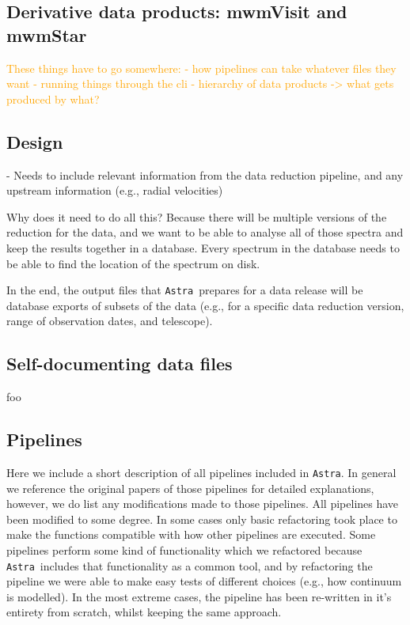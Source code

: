 \documentclass[modern]{aastex631}
\newcommand{\astra}{\texttt{Astra}}
\newcommand{\todo}[1]{\textcolor{orange}{#1}}
\begin{document}
\subsection{Derivative data products: mwmVisit and mwmStar}



\todo{
These things have to go somewhere:
- how pipelines can take whatever files they want
- running things through the cli
- hierarchy of data products -> what gets produced by what?
}


\subsection{Design}

- Needs to include relevant information from the data reduction pipeline, and any upstream information (e.g., radial velocities)

Why does it need to do all this? 
Because there will be multiple versions of the reduction for the data, and we want to be able to analyse all of those spectra and keep the results together in a database. Every spectrum in the database needs to be able to find the location of the spectrum on disk.

In the end, the output files that \astra\ prepares for a data release will be database exports of subsets of the data (e.g., for a specific data reduction version, range of observation dates, and telescope). 

\subsection{Self-documenting data files}
foo

\subsection{Pipelines}
Here we include a short description of all pipelines included in \astra. 
In general we reference the original papers of those pipelines for detailed explanations, however, we do list any modifications made to those pipelines.
All pipelines have been modified to some degree. In some cases only basic refactoring took place to make the functions compatible with how other pipelines are executed. Some pipelines perform some kind of functionality which we refactored because \astra\ includes that functionality as a common tool, and by refactoring the pipeline we were able to make easy tests of different choices (e.g., how continuum is modelled). In the most extreme cases, the pipeline has been re-written in it's entirety from scratch, whilst keeping the same approach.
\end{document}
